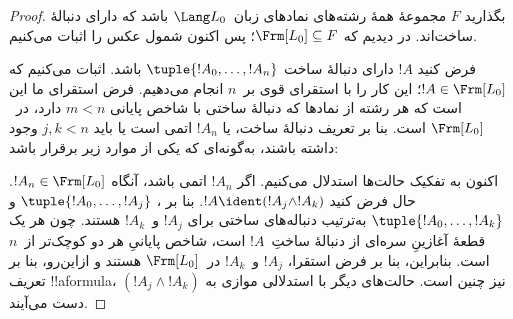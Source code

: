 \documentclass[../../../include/open-logic-section]{subfiles}
\begin{document}
\begin{proof}
بگذارید $F$ مجموعهٔ همهٔ رشته‌های نمادهای زبان~$\Lang L_0$ باشد که
دارای دنبالهٔ ساخت‌اند. در  دیدیم که
$\Frm[L_0] \subseteq F$؛ پس اکنون شمول عکس را اثبات می‌کنیم.

فرض کنید $!A$ دارای دنبالهٔ ساخت $\tuple{!A_0,\dotsc,!A_n}$ باشد.
اثبات می‌کنیم که $!A \in \Frm[L_0]$؛ این کار را با استقرای قوی
بر~$n$ انجام می‌دهیم.
فرض استقرای ما این است که هر رشته از نمادها که دنبالهٔ ساختی با شاخص پایانی
$m < n$ دارد، در~$\Frm[L_0]$ است. بنا بر تعریف دنبالهٔ ساخت، یا $!A_n$
اتمی است یا باید $j,k < n$ وجود داشته باشند، به‌گونه‌ای که یکی از موارد زیر
برقرار باشد:
\begin{enumerate}
\end{enumerate}
اکنون به تفکیک حالت‌ها استدلال می‌کنیم. اگر $!A_n$ اتمی باشد، آنگاه
$!A_n \in \Frm[L_0]$. حال فرض کنید $!A \ident
(!A_j \land !A_k)$. بنا بر ،
$\tuple{!A_0,\dotsc,!A_j}$ و $\tuple{!A_0,\dotsc,!A_k}$ به‌ترتیب
دنباله‌های ساختی برای $!A_j$ و~$!A_k$ هستند. چون هر یک قطعهٔ آغازینِ
سره‌ای از دنبالهٔ ساختِ~$!A$ است، شاخص پایانیِ هر دو کوچک‌تر از~$n$ است.
بنابراین، بنا بر فرض استقرا، $!A_j$ و~$!A_k$ در~$\Frm[L_0]$ هستند و
ازاین‌رو، بنا بر تعریف !!a{formula}،
$(!A_j \land !A_k)$ نیز چنین است. حالت‌های دیگر با استدلالی موازی
به دست می‌آیند.
\end{proof}
\end{document}
